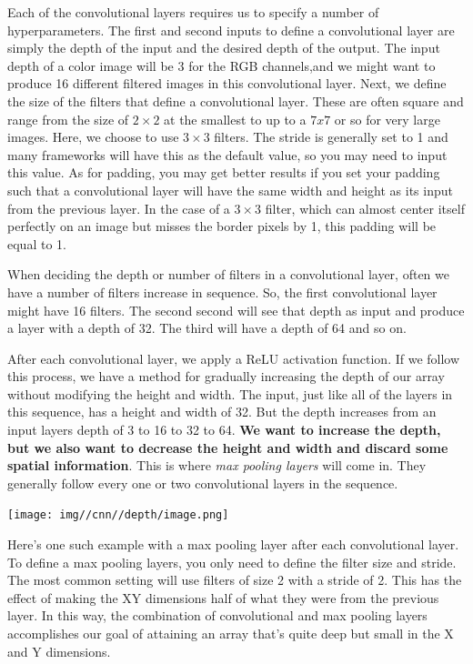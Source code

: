 Each of the convolutional layers requires us to specify a number of hyperparameters. The first and second inputs to define a convolutional layer are simply the depth of the input and the desired depth of the output. The input depth of a color image will be 3 for the RGB channels,and we might want to produce 16 different filtered images in this convolutional layer. Next, we define the size of the filters that define a convolutional layer. These are often square and range from the size of \(2 \times 2\) at the smallest to up to a \(7x7\) or so for very large images. Here, we choose to use \(3 \times 3\) filters.
The stride is generally set to 1 and many frameworks will have this as the default value, so you may need to input this value.
As for padding, you may get better results if you set your padding such that a convolutional layer will have the same width and height as its input from the previous layer. In the case of a \(3 \times 3\) filter, which can almost center itself perfectly on an image but misses the border pixels by 1, this padding will be equal to 1. \newline

When deciding the depth or number of filters in a convolutional layer,
often we have a number of filters increase in sequence. So, the first convolutional layer might have 16 filters. The second second will see that depth as input and produce a layer with a depth of 32. The third will have a depth of 64 and so on. \newline

After each convolutional layer, we apply a ReLU activation function. If we follow this process, we have a method for gradually increasing the depth of our array without modifying the height and width. The input, just like all of the layers in this sequence, has a height and width of 32. But the depth increases from an input layers depth of 3 to 16 to 32 to 64. \textbf{We want to increase the depth, but we also want to decrease the height and width and discard some spatial information}. This is where \textit{max pooling layers} will come in. They generally follow every one or two convolutional layers in the sequence.

\texttt{[image: img//cnn//depth/image.png]}

Here's one such example with a max pooling layer after each convolutional layer.
To define a max pooling layers, you only need to define the filter size and stride. The most common setting will use filters of size 2 with a stride of 2. This has the effect of making the XY dimensions half of what they were from the previous layer.
In this way, the combination of convolutional and max pooling layers accomplishes our goal of attaining an array that's quite deep but small in the X and Y dimensions. \newline

